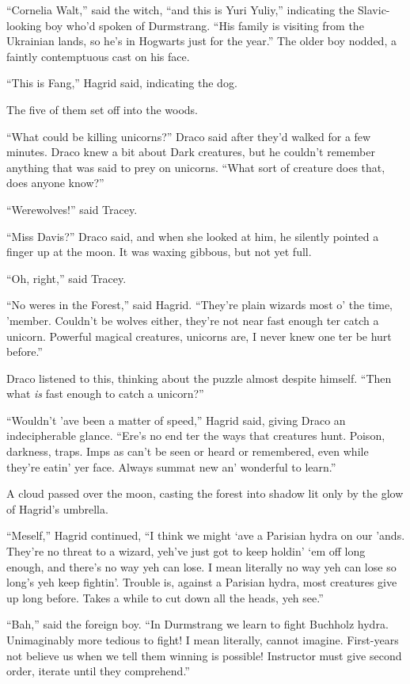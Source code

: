 ``Cornelia Walt,'' said the witch, ``and this is Yuri Yuliy,''
indicating the Slavic-looking boy who'd spoken of Durmstrang. ``His
family is visiting from the Ukrainian lands, so he's in Hogwarts just
for the year.'' The older boy nodded, a faintly contemptuous cast on his
face.

``This is Fang,'' Hagrid said, indicating the dog.

The five of them set off into the woods.

``What could be killing unicorns?'' Draco said after they'd walked for a
few minutes. Draco knew a bit about Dark creatures, but he couldn't
remember anything that was said to prey on unicorns. ``What sort of
creature does that, does anyone know?''

``Werewolves!'' said Tracey.

``Miss Davis?'' Draco said, and when she looked at him, he silently
pointed a finger up at the moon. It was waxing gibbous, but not yet
full.

``Oh, right,'' said Tracey.

``No weres in the Forest,'' said Hagrid. ``They're plain wizards most o'
the time, 'member. Couldn't be wolves either, they're not near fast
enough ter catch a unicorn. Powerful magical creatures, unicorns are, I
never knew one ter be hurt before.''

Draco listened to this, thinking about the puzzle almost despite
himself. ``Then what \emph{is} fast enough to catch a unicorn?''

``Wouldn't 'ave been a matter of speed,'' Hagrid said, giving Draco an
indecipherable glance. ``Ere's no end ter the ways that creatures hunt.
Poison, darkness, traps. Imps as can't be seen or heard or remembered,
even while they're eatin' yer face. Always summat new an' wonderful to
learn.''

A cloud passed over the moon, casting the forest into shadow lit only by
the glow of Hagrid's umbrella.

``Meself,'' Hagrid continued, ``I think we might `ave a Parisian hydra
on our 'ands. They're no threat to a wizard, yeh've just got to keep
holdin' `em off long enough, and there's no way yeh can lose. I mean
literally no way yeh can lose so long's yeh keep fightin'. Trouble is,
against a Parisian hydra, most creatures give up long before. Takes a
while to cut down all the heads, yeh see.''

``Bah,'' said the foreign boy. ``In Durmstrang we learn to fight
Buchholz hydra. Unimaginably more tedious to fight! I mean literally,
cannot imagine. First-years not believe us when we tell them winning is
possible! Instructor must give second order, iterate until they
comprehend.''


